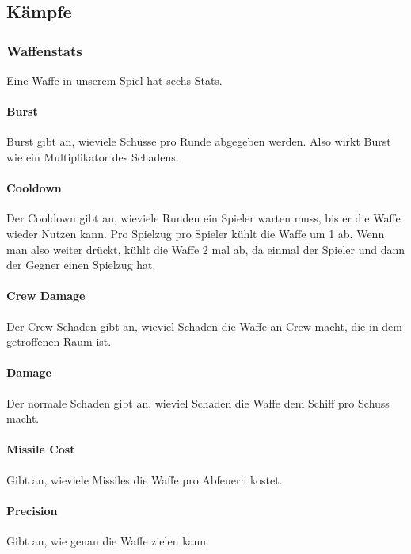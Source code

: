 \documentclass[fontsize=12pt,paper=a4,twoside]{scrartcl}
\begin{document}
\subsection{Kämpfe}

\subsubsection{Waffenstats}

Eine Waffe in unserem Spiel hat sechs Stats. 

\paragraph{Burst}
Burst gibt an, wieviele Schüsse pro Runde abgegeben werden. Also wirkt Burst wie ein Multiplikator des Schadens. 

\paragraph{Cooldown} 
Der Cooldown gibt an, wieviele Runden ein Spieler warten muss, bis er die Waffe wieder Nutzen kann. Pro Spielzug pro Spieler kühlt die Waffe um 1 ab. Wenn man also weiter drückt, kühlt die Waffe 2 mal ab, da einmal der Spieler und dann der Gegner einen Spielzug hat. 

\paragraph{Crew Damage}
Der Crew Schaden gibt an, wieviel Schaden die Waffe an Crew macht, die in dem getroffenen Raum ist. 

\paragraph{Damage}

Der normale Schaden gibt an, wieviel Schaden die Waffe dem Schiff pro Schuss macht. 

\paragraph{Missile Cost}

Gibt an, wieviele Missiles die Waffe pro Abfeuern kostet. 

\paragraph{Precision} Gibt an, wie genau die Waffe zielen kann.
\end{document}
